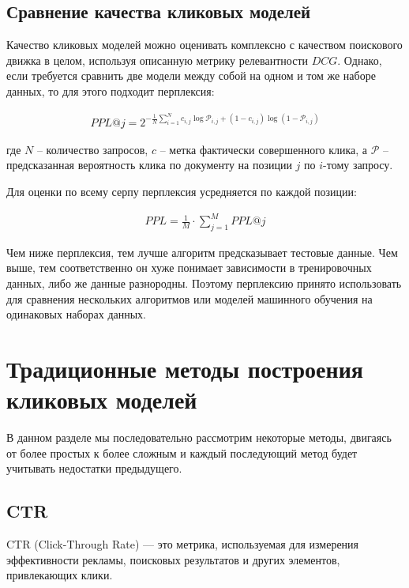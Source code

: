 \documentclass[diploma]{nanolab2015}
\begin{document}
\subsection{Сравнение качества кликовых моделей}
Качество кликовых моделей можно оценивать комплексно с качеством поискового движка в целом, используя описанную метрику релевантности $DCG$. Однако, если требуется сравнить две модели между собой на одном и том же наборе данных, то для этого подходит перплексия:

\begin{align}
    PPL@j = 2^{-\frac{1}{N}\sum_{i=1}^{N}c_{i,j}\log\mathcal{P}_{i,j} + (1 - c_{i,j})\log(1 - \mathcal{P}_{i,j}) }
\end{align}

где $N$ -- количество запросов, $c$ -- метка фактически совершенного клика, а $\mathcal{P}$ -- предсказанная вероятность клика по документу на позиции $j$ по $i$-тому запросу.

Для оценки по всему серпу перплексия усредняется по каждой позиции:

\begin{align}
    PPL = \frac{1}{M} \cdot \sum_{j=1}^{M} PPL@j
\end{align}

Чем ниже перплексия, тем лучше алгоритм предсказывает тестовые данные. Чем выше, тем соответственно он хуже понимает зависимости в тренировочных данных, либо же данные разнородны. Поэтому перплексию принято использовать для сравнения нескольких алгоритмов или моделей машинного обучения на одинаковых наборах данных.

\section{Традиционные методы построения кликовых моделей}
В данном разделе мы последовательно рассмотрим некоторые методы, двигаясь от более простых к более сложным и каждый последующий метод будет учитывать недостатки предыдущего.
\subsection{CTR}
CTR (Click-Through Rate) — это метрика, используемая для измерения эффективности рекламы, поисковых результатов и других элементов, привлекающих клики. %
\end{document}
